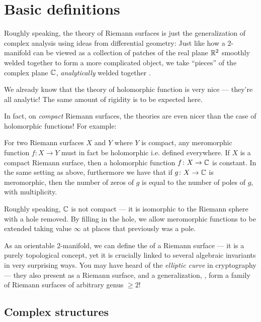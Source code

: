 \chapter{Basic definitions}
\label{ch:complex_structure_def}

Roughly speaking, the theory of Riemann surfaces is just the generalization of complex analysis
using ideas from differential geometry:
Just like how a $2$-manifold can be viewed as a collection of patches of the real plane $\mathbb R^2$
smoothly welded together to form a more complicated object,
we take ``pieces'' of the complex plane $\mathbb C$, \emph{analytically} welded together .

We already know that the theory of holomorphic function is very nice --- they're all analytic!
The same amount of rigidity is to be expected here.

In fact, on \emph{compact} Riemann surfaces, the theories are even nicer than the case of
holomorphic functions! For example:
\begin{itemize}
	\ii For two Riemann surfaces $X$ and $Y$ where $Y$ is compact, any meromorphic function $f
	\colon X \to Y$ must in fact be holomorphic i.e. defined everywhere.
	\ii If $X$ is a compact Riemann surface, then a holomorphic function $f \colon X \to \mathbb C$ is
	constant.
	\ii In the same setting as above, furthermore we have that if $g \colon X \to \mathbb C$ is
	meromorphic, then the number of zeros of $g$ is equal to the number of poles of $g$, with
	multiplicity.
\end{itemize}

\begin{remark}
Roughly speaking, $\mathbb C$ is not compact --- it is isomorphic to the Riemann sphere with a hole
removed. By filling in the hole, we allow meromorphic functions to be extended taking value $\infty$
at places that previously was a pole.
\end{remark}

As an orientable $2$-manifold, we can define the  of a Riemann surface --- it is a
purely topological concept, yet it is crucially linked to several algebraic invariants
in very surprising ways.
You may have heard of the \emph{elliptic curve} in cryptography --- they also present as a Riemann
surface, and a generalization, , form a family of Riemann surfaces of
arbitrary genus $\geq 2$!

\section{Complex structures}

